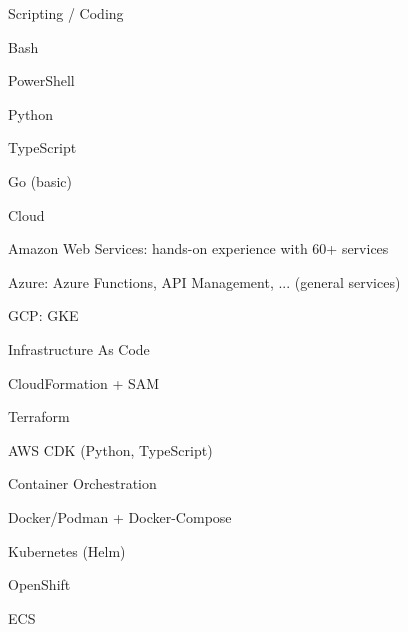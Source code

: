 

\begin{cvskills}

  \cvskill
    {Scripting / Coding} %
    {
      \begin{cvitems} %
        \item {Bash} %
        \item {PowerShell} %
        \item {Python} %
        \item {TypeScript} %
        \item {Go (basic)} %
      \end{cvitems}
    }

  \cvskill
    {Cloud} %
    {
      \begin{cvitems} %
        \item {Amazon Web Services: hands-on experience with 60+ services} %
        \item {Azure: Azure Functions, API Management, ... (general services)} %
        \item {GCP: GKE} %
      \end{cvitems}
    }

  \cvskill
    {Infrastructure As Code} %
    {
      \begin{cvitems} %
        \item {CloudFormation + SAM} %
        \item {Terraform} %
        \item {AWS CDK (Python, TypeScript)} %
      \end{cvitems}
    }

  \cvskill
    {Container Orchestration} %
    {
      \begin{cvitems} %
        \item {Docker/Podman + Docker-Compose} %
        \item {Kubernetes (Helm)} %
        \item {OpenShift} %
        \item {ECS} %
      \end{cvitems}
    }


\end{cvskills}
